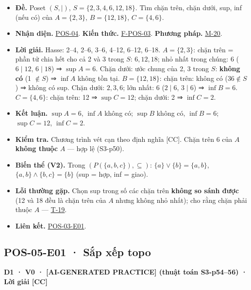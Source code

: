 \documentclass[
  10pt,
  twoside,openany]{book}
\providecommand{\tightlist}{%
  \setlength{\itemsep}{0pt}\setlength{\parskip}{0pt}}
\begin{document}
\begin{itemize}
\tightlist
\item
  \textbf{Đề.} Poset \((S,\mid)\), \(S=\{2,3,4,6,12,18\}\). Tìm chặn
  trên, chặn dưới, sup, inf (nếu có) của \(A=\{2,3\}\), \(B=\{12,18\}\),
  \(C=\{4,6\}\).
\item
  \textbf{Nhận diện.} \protect\hyperlink{POS-04}{POS-04}. \textbf{Kiến
  thức.} \protect\hyperlink{F-POS-03}{F-POS-03}. \textbf{Phương pháp.}
  \protect\hyperlink{M-20}{M-20}.
\item
  \textbf{Lời giải.} Hasse: 2--4, 2--6, 3--6, 4--12, 6--12, 6--18.
  \(A=\{2,3\}\): chặn trên = phần tử chia hết cho cả 2 và 3 trong \(S\):
  \(6,12,18\); nhỏ nhất trong chúng: 6 (\(6\mid12\), \(6\mid18\)) ⇒
  \(\sup A=6\). Chặn dưới: ước chung của 2, 3 trong \(S\): \textbf{không
  có} (1 \(\notin S\)) ⇒ \(\inf A\) không tồn tại. \(B=\{12,18\}\): chặn
  trên: không có (\(36\notin S\)) ⇒ không có sup. Chặn dưới: \(2,3,6\);
  lớn nhất: 6 (\(2\mid6\), \(3\mid6\)) ⇒ \(\inf B=6\). \(C=\{4,6\}\):
  chặn trên: 12 ⇒ \(\sup C=12\); chặn dưới: 2 ⇒ \(\inf C=2\).
\item
  \textbf{Kết luận.} \(\sup A=6\), \(\inf A\) không có; \(\sup B\) không
  có, \(\inf B=6\); \(\sup C=12\), \(\inf C=2\).
\item
  \textbf{Kiểm tra.} Chương trình vét cạn theo định nghĩa {[}CC{]}. Chặn
  trên 6 của \(A\) \textbf{không thuộc} \(A\) --- hợp lệ (S3-p50).
\item
  \textbf{Biến thể (V2).} Trong \((P(\{a,b,c\}),\subseteq)\):
  \(\{a\}\vee\{b\}=\{a,b\}\), \(\{a,b\}\wedge\{b,c\}=\{b\}\) (sup = hợp,
  inf = giao).
\item
  \textbf{Lỗi thường gặp.} Chọn sup trong số các chặn trên \textbf{không
  so sánh được} (12 và 18 đều là chặn trên của \(A\) nhưng không nhỏ
  nhất); cho rằng chặn phải thuộc \(A\) ---
  \protect\hyperlink{T-19}{T-19}.
\item
  \textbf{Liên kết.} \protect\hyperlink{POS-03-E01}{POS-03-E01}.
\end{itemize}

\hypertarget{POS-05-E01}{%
\subsection{POS-05-E01 · Sắp xếp topo}\label{POS-05-E01}}

\textbf{D1 · V0 · {[}AI-GENERATED PRACTICE{]} (thuật toán S3-p54--56) ·
Lời giải {[}CC{]}}
\end{document}
